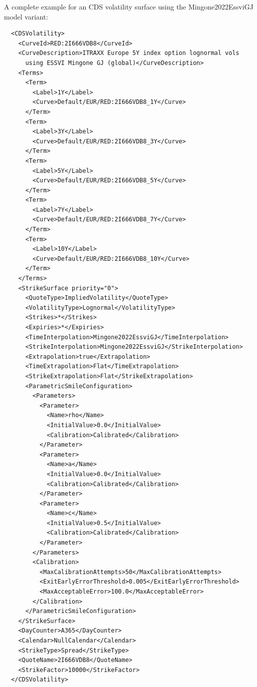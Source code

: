 \documentclass{amsart}
\theoremstyle{plain}
\numberwithin{equation}{section}
\begin{document}
A complete example for an CDS volatility surface using the Mingone2022EssviGJ model variant:

\begin{verbatim}
  <CDSVolatility>
    <CurveId>RED:2I666VDB8</CurveId>
    <CurveDescription>ITRAXX Europe 5Y index option lognormal vols
      using ESSVI Mingone GJ (global)</CurveDescription>
    <Terms>
      <Term>
        <Label>1Y</Label>
        <Curve>Default/EUR/RED:2I666VDB8_1Y</Curve>
      </Term>
      <Term>
        <Label>3Y</Label>
        <Curve>Default/EUR/RED:2I666VDB8_3Y</Curve>
      </Term>
      <Term>
        <Label>5Y</Label>
        <Curve>Default/EUR/RED:2I666VDB8_5Y</Curve>
      </Term>
      <Term>
        <Label>7Y</Label>
        <Curve>Default/EUR/RED:2I666VDB8_7Y</Curve>
      </Term>
      <Term>
        <Label>10Y</Label>
        <Curve>Default/EUR/RED:2I666VDB8_10Y</Curve>
      </Term>
    </Terms>
    <StrikeSurface priority="0">
      <QuoteType>ImpliedVolatility</QuoteType>
      <VolatilityType>Lognormal</VolatilityType>
      <Strikes>*</Strikes>
      <Expiries>*</Expiries>
      <TimeInterpolation>Mingone2022EssviGJ</TimeInterpolation>
      <StrikeInterpolation>Mingone2022EssviGJ</StrikeInterpolation>
      <Extrapolation>true</Extrapolation>
      <TimeExtrapolation>Flat</TimeExtrapolation>
      <StrikeExtrapolation>Flat</StrikeExtrapolation>
      <ParametricSmileConfiguration>
        <Parameters>
          <Parameter>
            <Name>rho</Name>
            <InitialValue>0.0</InitialValue>
            <Calibration>Calibrated</Calibration>
          </Parameter>
          <Parameter>
            <Name>a</Name>
            <InitialValue>0.0</InitialValue>
            <Calibration>Calibrated</Calibration>
          </Parameter>
          <Parameter>
            <Name>c</Name>
            <InitialValue>0.5</InitialValue>
            <Calibration>Calibrated</Calibration>
          </Parameter>
        </Parameters>
        <Calibration>
          <MaxCalibrationAttempts>50</MaxCalibrationAttempts>
          <ExitEarlyErrorThreshold>0.005</ExitEarlyErrorThreshold>
          <MaxAcceptableError>100.0</MaxAcceptableError>
        </Calibration>
      </ParametricSmileConfiguration>
    </StrikeSurface>
    <DayCounter>A365</DayCounter>
    <Calendar>NullCalendar</Calendar>
    <StrikeType>Spread</StrikeType>
    <QuoteName>2I666VDB8</QuoteName>
    <StrikeFactor>10000</StrikeFactor>
  </CDSVolatility>
\end{verbatim}
\end{document}
